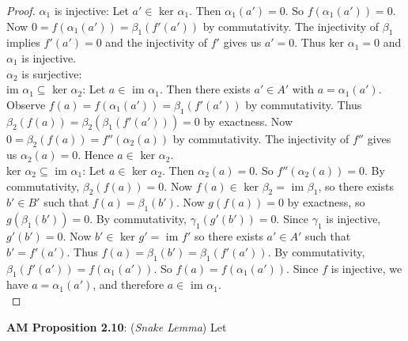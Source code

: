 \documentclass[8pt]{amsart}
\theoremstyle{plain}%
\theoremstyle{definition}
\theoremstyle{remark}
\numberwithin{equation}{section}
\begin{document}
	\begin{proof}$\alpha_1$ is injective: Let $a' \in$ ker $\alpha_1$. Then $\alpha_1(a')=0$. So $f(\alpha_1(a'))=0$. Now $0=f(\alpha_1(a'))=\beta_1(f'(a'))$ by commutativity. The injectivity of $\beta_1$ implies $f'(a')=0$ and the injectivity of $f'$ gives us $a'=0$. Thus ker $\alpha_1=0$ and $\alpha_1$ is injective.\\
	
	$\alpha_2$ is surjective: \\
	
	im $\alpha_1\subseteq$ ker $\alpha_2$: Let $a \in$ im $\alpha_1$. Then there exists $a' \in A'$ with $a=\alpha_1(a')$. Observe $f(a)=f(\alpha_1(a'))=\beta_1(f'(a'))$ by commutativity. Thus $\beta_2(f(a))=\beta_2(\beta_1(f'(a')))=0$ by exactness. Now $0=\beta_2(f(a))=f''(\alpha_2(a))$ by commutativity. The injectivity of $f''$ gives us $\alpha_2(a)=0$. Hence $a \in$ ker $\alpha_2$.\\
	
	ker $\alpha_2 \subseteq$ im $\alpha_1$: Let $a  \in$ ker $\alpha_2$. Then $\alpha_2(a)=0$. So $f''(\alpha_2(a))=0$. By commutativity, $\beta_2(f(a))=0$. Now $f(a) \in$ ker $\beta_2 =$ im $\beta_1$, so there exists $b' \in B'$ such that $f(a)=\beta_1(b')$. Now $g(f(a))=0$ by exactness, so $g(\beta_1(b'))=0$. By commutativity, $\gamma_1(g'(b'))=0$. Since $\gamma_1$ is injective, $g'(b')=0$. Now $b' \in$ ker $g'=$ im $f'$ so there exists $a' \in A'$ such that $b'=f'(a')$. Thus $f(a)=\beta_1(b')=\beta_1(f'(a'))$. By commutativity, $\beta_1(f'(a'))=f(\alpha_1(a'))$. So $f(a)=f(\alpha_1(a'))$. Since $f$ is injective, we have $a=\alpha_1(a')$, and therefore $a\in$ im $\alpha_1$. \\
 \end{proof}

\textbf{AM Proposition 2.10}: (\textit{Snake Lemma}) Let

	\begin{center}
	\end{center}
\end{document}
